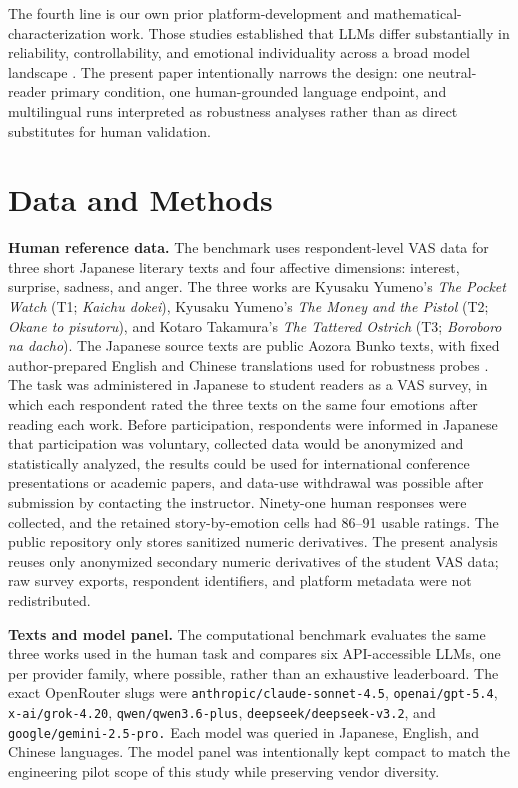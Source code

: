 \documentclass[conference,a4paper]{IEEEtran}
\begin{document}
The fourth line is our own prior platform-development and mathematical-characterization work. Those studies established that LLMs differ substantially in reliability, controllability, and emotional individuality across a broad model landscape \cite{openrouterplatform,shirahama2026mdpi}. The present paper intentionally narrows the design: one neutral-reader primary condition, one human-grounded language endpoint, and multilingual runs interpreted as robustness analyses rather than as direct substitutes for human validation.

\section{Data and Methods}
\textbf{Human reference data.} The benchmark uses respondent-level VAS data for three short Japanese literary texts and four affective dimensions: interest, surprise, sadness, and anger. The three works are Kyusaku Yumeno's \textit{The Pocket Watch} (T1; \textit{Kaichu dokei}), Kyusaku Yumeno's \textit{The Money and the Pistol} (T2; \textit{Okane to pisutoru}), and Kotaro Takamura's \textit{The Tattered Ostrich} (T3; \textit{Boroboro na dacho}). The Japanese source texts are public Aozora Bunko texts, with fixed author-prepared English and Chinese translations used for robustness probes \cite{aozora}. The task was administered in Japanese to student readers as a VAS survey, in which each respondent rated the three texts on the same four emotions after reading each work. Before participation, respondents were informed in Japanese that participation was voluntary, collected data would be anonymized and statistically analyzed, the results could be used for international conference presentations or academic papers, and data-use withdrawal was possible after submission by contacting the instructor. Ninety-one human responses were collected, and the retained story-by-emotion cells had 86--91 usable ratings. The public repository only stores sanitized numeric derivatives. The present analysis reuses only anonymized secondary numeric derivatives of the student VAS data; raw survey exports, respondent identifiers, and platform metadata were not redistributed.

\textbf{Texts and model panel.} The computational benchmark evaluates the same three works used in the human task and compares six API-accessible LLMs, one per provider family, where possible, rather than an exhaustive leaderboard. The exact OpenRouter slugs were \texttt{anthropic/claude-sonnet-4.5}, \texttt{openai/gpt-5.4}, \texttt{x-ai/grok-4.20}, \texttt{qwen/qwen3.6-plus}, \texttt{deepseek/deepseek-v3.2}, and \texttt{google/gemini-2.5-pro.} Each model was queried in Japanese, English, and Chinese languages. The model panel was intentionally kept compact to match the engineering pilot scope of this study while preserving vendor diversity.
\end{document}
